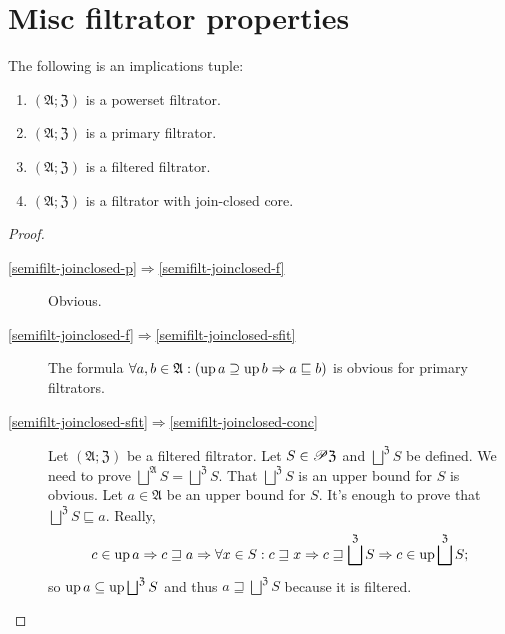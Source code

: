 \section{Misc filtrator properties}
\begin{thm}
\label{semifilt-joinclosed}The following is an implications tuple:
\begin{enumerate}
\item \label{semifilt-joinclosed-p}$(\mathfrak{A};\mathfrak{Z})$ is a
powerset filtrator.
\item \label{semifilt-joinclosed-f}$(\mathfrak{A};\mathfrak{Z})$ is a
primary filtrator.
\item \label{semifilt-joinclosed-sfit}$(\mathfrak{A};\mathfrak{Z})$ is
a filtered filtrator.
\item \label{semifilt-joinclosed-conc}$(\mathfrak{A};\mathfrak{Z})$ is
a filtrator with join-closed core.
\end{enumerate}
\end{thm}
\begin{proof}
~
\begin{description}
\item [{\ref{semifilt-joinclosed-p}$\Rightarrow$\ref{semifilt-joinclosed-f}}] Obvious.
\item [{\ref{semifilt-joinclosed-f}$\Rightarrow$\ref{semifilt-joinclosed-sfit}}] The formula
$\forall a,b\in\mathfrak{A}:(\operatorname{up} a\supseteq\operatorname{up} b\Rightarrow a\sqsubseteq b)$ is obvious for primary filtrators.
\item [{\ref{semifilt-joinclosed-sfit}$\Rightarrow$\ref{semifilt-joinclosed-conc}}] Let
$(\mathfrak{A};\mathfrak{Z})$ be a filtered filtrator. Let $S\in\mathscr{P}\mathfrak{Z}$
and $\bigsqcup^{\mathfrak{Z}}S$ be defined. We need to prove $\bigsqcup^{\mathfrak{A}}S=\bigsqcup^{\mathfrak{Z}}S$.
That $\bigsqcup^{\mathfrak{Z}}S$ is an upper bound for $S$ is obvious.
Let $a\in\mathfrak{A}$ be an upper bound for $S$. It's enough to
prove that $\bigsqcup^{\mathfrak{Z}}S\sqsubseteq a$. Really,
\[
c\in\operatorname{up} a\Rightarrow c\sqsupseteq a\Rightarrow\forall x\in S:c\sqsupseteq x\Rightarrow c\sqsupseteq\bigsqcup^{\mathfrak{Z}}S\Rightarrow c\in\operatorname{up}\bigsqcup^{\mathfrak{Z}}S;
\]
so $\operatorname{up} a\subseteq\operatorname{up}\bigsqcup^{\mathfrak{Z}}S$ and thus $a\sqsupseteq\bigsqcup^{\mathfrak{Z}}S$
because it is filtered.
\end{description}
\end{proof}

